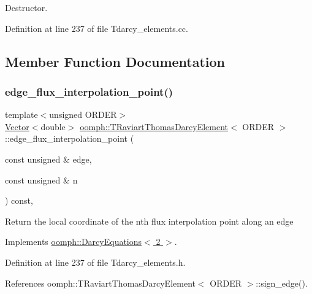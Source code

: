 Destructor. 



Definition at line 237 of file Tdarcy\+\_\+elements.\+cc.



\subsection{Member Function Documentation}
\mbox{\label{classoomph_1_1TRaviartThomasDarcyElement_adde4a19355d0a4142c462d2271e5cbcf}} 
\subsubsection{\texorpdfstring{edge\+\_\+flux\+\_\+interpolation\+\_\+point()}{edge\_flux\_interpolation\_point()}}
{\footnotesize\ttfamily template$<$unsigned O\+R\+D\+ER$>$ \\
\hyperlink{classoomph_1_1Vector}{Vector}$<$double$>$ \hyperlink{classoomph_1_1TRaviartThomasDarcyElement}{oomph\+::\+T\+Raviart\+Thomas\+Darcy\+Element}$<$ O\+R\+D\+ER $>$\+::edge\+\_\+flux\+\_\+interpolation\+\_\+point (\begin{DoxyParamCaption}\item[{const unsigned \&}]{edge,  }\item[{const unsigned \&}]{n }\end{DoxyParamCaption}) const\hspace{0.3cm}{\ttfamily [inline]}, {\ttfamily [virtual]}}

Return the local coordinate of the nth flux interpolation point along an edge 

Implements \hyperlink{classoomph_1_1DarcyEquations_aebfe04cc9fedf1ba024b4db2b1d44de5}{oomph\+::\+Darcy\+Equations$<$ 2 $>$}.



Definition at line 237 of file Tdarcy\+\_\+elements.\+h.



References oomph\+::\+T\+Raviart\+Thomas\+Darcy\+Element$<$ O\+R\+D\+E\+R $>$\+::sign\+\_\+edge().



